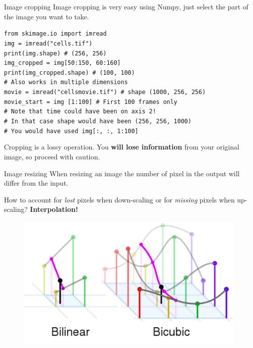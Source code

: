 \documentclass[9pt, aspectratio=169]{beamer}
\begin{document}
\begin{frame}
	{Image cropping}
	Image cropping is very easy using Numpy, just select the part of the image you want to take.

	\begin{codebox}
		\texttt{from skimage.io import imread\\
			img = imread("cells.tif")\\
			print(img.shape) \# (256, 256)\\
			\pause
			img\_cropped = img[50:150, 60:160]\\
			print(img\_cropped.shape) \# (100, 100)\\
			\pause
			\# Also works in multiple dimensions\\
			movie = imread("cellsmovie.tif") \# shape (1000, 256, 256)\\
			movie\_start = img
				[1:100] \# First 100 frames only\\
			\pause
			\# Note that time could have been on axis 2!\\
			\# In that case shape would have been (256, 256, 1000)\\
			\# You would have used img[:, :, 1:100]
		}
	\end{codebox}

	{
		Cropping is a lossy operation. You \textbf{will lose information} from your original image, so proceed with caution.
	}
\end{frame}

\begin{frame}
	{Image resizing}
	When resizing an image the number of pixel in the output will differ from the input.

	How to account for \textit{lost} pixels when down-scaling or for \textit{missing} pixels when up-scaling? \textbf{Interpolation!}

	\pause
	\begin{figure}
		\centering
		\includegraphics[width=.5\textwidth]{interpolations.png}
	\end{figure}
\end{frame}
\end{document}
